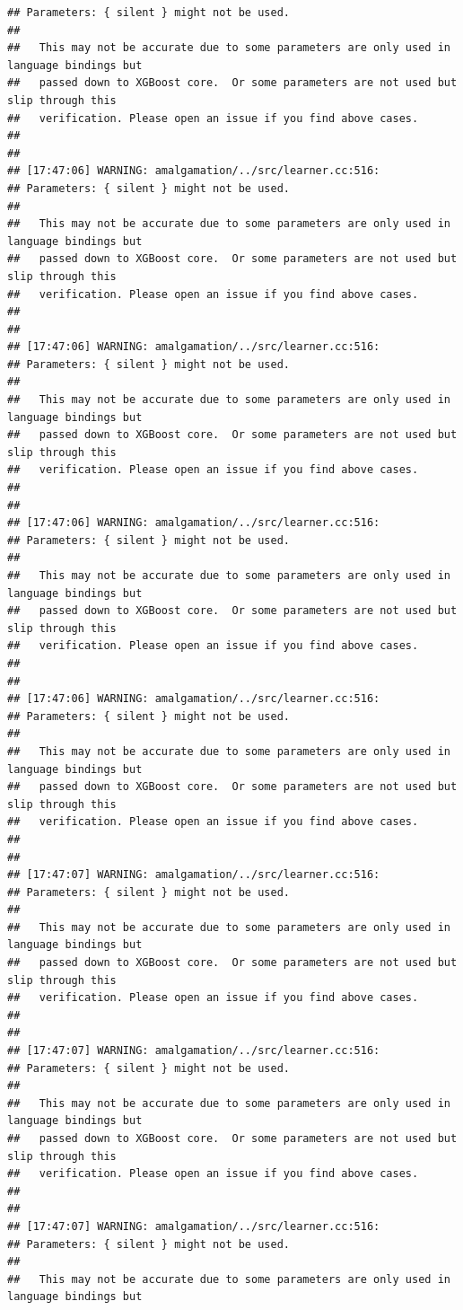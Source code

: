 \documentclass[AMS,STIX2COL]{WileyNJD-v2}\usepackage[]{graphicx}\usepackage[]{color}
\makeatletter
\newenvironment{kframe}{%
 \def\at@end@of@kframe{}%
 \ifinner\ifhmode%
  \def\at@end@of@kframe{\end{minipage}}%
  \begin{minipage}{\columnwidth}%
 \fi\fi%
 \def\FrameCommand##1{\hskip\@totalleftmargin \hskip-\fboxsep
 \colorbox{shadecolor}{##1}\hskip-\fboxsep
     \hskip-\linewidth \hskip-\@totalleftmargin \hskip\columnwidth}%
 \MakeFramed {\advance\hsize-\width
   \@totalleftmargin\z@ \linewidth\hsize
   \@setminipage}}%
 {\par\unskip\endMakeFramed%
 \at@end@of@kframe}
\newenvironment{knitrout}{}{} %
\makeatother
\begin{document}
\begin{knitrout}
\begin{kframe}
\begin{verbatim}
## Parameters: { silent } might not be used.
## 
##   This may not be accurate due to some parameters are only used in language bindings but
##   passed down to XGBoost core.  Or some parameters are not used but slip through this
##   verification. Please open an issue if you find above cases.
## 
## 
## [17:47:06] WARNING: amalgamation/../src/learner.cc:516: 
## Parameters: { silent } might not be used.
## 
##   This may not be accurate due to some parameters are only used in language bindings but
##   passed down to XGBoost core.  Or some parameters are not used but slip through this
##   verification. Please open an issue if you find above cases.
## 
## 
## [17:47:06] WARNING: amalgamation/../src/learner.cc:516: 
## Parameters: { silent } might not be used.
## 
##   This may not be accurate due to some parameters are only used in language bindings but
##   passed down to XGBoost core.  Or some parameters are not used but slip through this
##   verification. Please open an issue if you find above cases.
## 
## 
## [17:47:06] WARNING: amalgamation/../src/learner.cc:516: 
## Parameters: { silent } might not be used.
## 
##   This may not be accurate due to some parameters are only used in language bindings but
##   passed down to XGBoost core.  Or some parameters are not used but slip through this
##   verification. Please open an issue if you find above cases.
## 
## 
## [17:47:06] WARNING: amalgamation/../src/learner.cc:516: 
## Parameters: { silent } might not be used.
## 
##   This may not be accurate due to some parameters are only used in language bindings but
##   passed down to XGBoost core.  Or some parameters are not used but slip through this
##   verification. Please open an issue if you find above cases.
## 
## 
## [17:47:07] WARNING: amalgamation/../src/learner.cc:516: 
## Parameters: { silent } might not be used.
## 
##   This may not be accurate due to some parameters are only used in language bindings but
##   passed down to XGBoost core.  Or some parameters are not used but slip through this
##   verification. Please open an issue if you find above cases.
## 
## 
## [17:47:07] WARNING: amalgamation/../src/learner.cc:516: 
## Parameters: { silent } might not be used.
## 
##   This may not be accurate due to some parameters are only used in language bindings but
##   passed down to XGBoost core.  Or some parameters are not used but slip through this
##   verification. Please open an issue if you find above cases.
## 
## 
## [17:47:07] WARNING: amalgamation/../src/learner.cc:516: 
## Parameters: { silent } might not be used.
## 
##   This may not be accurate due to some parameters are only used in language bindings but

\end{verbatim}
\end{kframe}
\end{knitrout}
\end{document}
